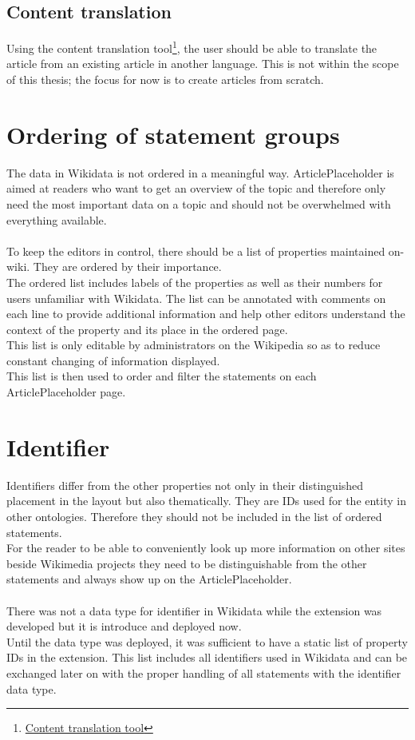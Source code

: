 \subsection{Content translation}
Using the content translation tool\footnote{\href{https://www.mediawiki.org/wiki/Content_translation}{Content translation tool}}, the user should be able to translate the article from an existing article in another language. This is not within the scope of this thesis; the focus for now is to create articles from scratch. \\

\section{Ordering of statement groups}
The data in Wikidata is not ordered in a meaningful way. ArticlePlaceholder is aimed at readers who want to get an overview of the topic and therefore only need the most important data on a topic and should not be overwhelmed with everything available. \\
\\
To keep the editors in control, there should be a list of properties maintained on-wiki. They are ordered by their importance. \\
The ordered list includes labels of the properties as well as their numbers for users unfamiliar with Wikidata. The list can be annotated with comments on each line to provide additional information and help other editors understand the context of the property and its place in the ordered page. \\
This list is only editable by administrators on the Wikipedia so as to reduce constant changing of information displayed. \\
This list is then used to order and filter the statements on each ArticlePlaceholder page. 

\section {Identifier}
Identifiers differ from the other properties not only in their distinguished placement in the layout but also thematically. They are IDs used for the entity in other ontologies. Therefore they should not be included in the list of ordered statements. \\
For the reader to be able to conveniently look up more information on other sites beside Wikimedia projects they need to be distinguishable from the other statements and always show up on the ArticlePlaceholder. \\
\\
There was not a data type for identifier in Wikidata while the extension was developed but it is introduce and deployed now. \\
Until the data type was deployed, it was sufficient to have a static list of property IDs in the extension. This list includes all identifiers used in Wikidata and can be exchanged later on with the proper handling of all statements with the identifier data type.

